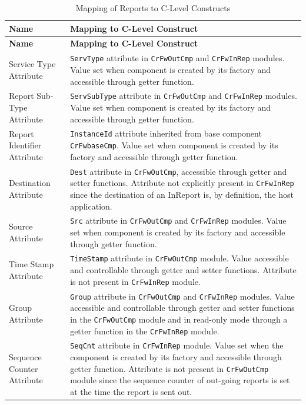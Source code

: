 \documentclass[a4paper,10pt]{article}
\begin{document}
\begin{longtable}{|>{\raggedright}p{2.0cm}|p{9.3cm}|}
\caption{Mapping of Reports to C-Level Constructs} \label{tab:RepConceptMapping}\\
\hline
\rowcolor{light-gray}
\textbf{Name} & \textbf{Mapping to C-Level Construct} \\
\hline\hline
\endfirsthead
\rowcolor{light-gray}
\textbf{Name} & \textbf{Mapping to C-Level Construct} \\
\hline\hline
\endhead
Service Type Attribute & \texttt{ServType} attribute in \texttt{CrFwOutCmp} and \texttt{CrFwInRep} modules. Value set when component is created by its factory and accessible through getter function. \\
\hline
Report Sub-Type Attribute & \texttt{ServSubType} attribute in \texttt{CrFwOutCmp} and \texttt{CrFwInRep} modules. Value set when component is created by its factory and accessible through getter function. \\
\hline
Report Identifier Attribute & \texttt{InstanceId} attribute inherited from base component \texttt{CrFwbaseCmp}. Value set when component is created by its factory and accessible through getter function. \\
\hline
Destination Attribute & \texttt{Dest} attribute in \texttt{CrFwOutCmp}, accessible through getter and setter functions. Attribute not explicitly present in \texttt{CrFwInRep} since the destination of an InReport is, by definition, the host application. \\
\hline
Source Attribute & \texttt{Src} attribute in \texttt{CrFwOutCmp} and \texttt{CrFwInRep} modules. Value set when component is created by its factory and accessible through getter function. \\
\hline
Time Stamp Attribute & \texttt{TimeStamp} attribute in \texttt{CrFwOutCmp} module. Value accessible and controllable through getter and setter functions. Attribute is not present in \texttt{CrFwInRep} module. \\
\hline
Group Attribute & \texttt{Group} attribute in \texttt{CrFwOutCmp} and \texttt{CrFwInRep} modules. Value accessible and controllable through getter and setter functions in the \texttt{CrFwOutCmp} module and in read-only mode through a getter function in the \texttt{CrFwInRep} module.  \\
\hline
Sequence Counter Attribute & \texttt{SeqCnt} attribute in \texttt{CrFwInRep} module. Value set when the component is created by its factory and accessible through getter function. Attribute is not present in \texttt{CrFwOutCmp} module since the sequence counter of out-going reports is set at the time the report is sent out. \\

\end{longtable}
\end{document}
